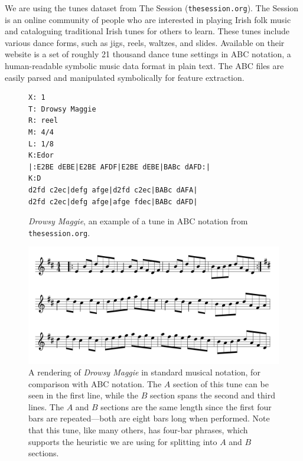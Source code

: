 \documentclass{article} %
\begin{document}
We are using the tunes dataset from The Session (\texttt{thesession.org}). The
Session is an online community of people who are interested in playing Irish
folk music and cataloguing traditional Irish tunes for others to learn. These
tunes include various dance forms, such as jigs, reels, waltzes, and slides.
Available on their website is a set of roughly 21 thousand dance tune settings
in ABC notation, a human-readable symbolic music data format in plain text. The
ABC files are easily parsed and manipulated symbolically for feature extraction.
\FloatBarrier
\begin{figure}[t]
  \begin{verbatim}
X: 1
T: Drowsy Maggie
R: reel
M: 4/4
L: 1/8
K:Edor
|:E2BE dEBE|E2BE AFDF|E2BE dEBE|BABc dAFD:|
K:D
d2fd c2ec|defg afge|d2fd c2ec|BABc dAFA|
d2fd c2ec|defg afge|afge fdec|BABc dAFD|
  \end{verbatim}
  \caption{\textit{Drowsy Maggie}, an example of a tune in ABC notation from
  \texttt{thesession.org}.}
\end{figure}

\begin{figure}[t]
  \begin{center}
    \includegraphics[width=5in]{drowsymaggie.png}
  \end{center}
  \caption{A rendering of \textit{Drowsy Maggie} in standard musical notation, for
  comparison with ABC notation. The $A$ section of this tune can be seen in the
first line, while the $B$ section spans the second and third lines. The $A$ and
$B$ sections are the same length since the first four bars are repeated---both
are eight bars long when performed. Note that this tune, like many others, has
four-bar phrases, which supports the heuristic we are using for splitting into
$A$ and $B$ sections.}
  \label{fig:drowsymusic}
\end{figure}
\end{document}
